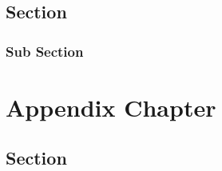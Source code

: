 \documentclass[12pt]{book}
\begin{document}
\section{Section}
\subsection{Sub Section}


\appendix

\chapter{Appendix Chapter}

\section{Section}
\end{document}
